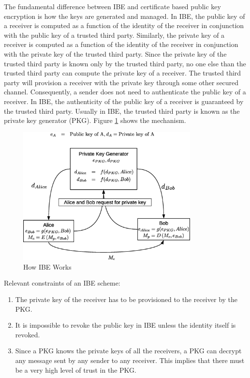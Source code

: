 \documentclass{river-journal}
\begin{document}
The fundamental difference between IBE and certificate based public key encryption is how the keys are generated and managed. In IBE, the public key of a receiver is computed as a function of the identity of the receiver in conjunction with the public key of a trusted third party. Similarly, the private key of a receiver is computed as a function of the identity of the receiver in conjunction with the private key of the trusted third party. Since the private key of the trusted third party is known only by the trusted third party, no one else than the trusted third party can compute the private key of a receiver. The trusted third party will provision a receiver with the private key through some other secured channel. Consequently, a sender does not need to authenticate the public key of a receiver. In IBE, the authenticity of the public key of a receiver is guaranteed by the trusted third party. Usually in IBE, the trusted third party is known as the private key generator (PKG). Figure \ref{fig:how_IBE_works} shows the mechanism.


\begin{figure}
\begin{center}
  \includegraphics[height=7cm]{how_IBE_works.eps}
\caption{How IBE Works}
\label{fig:how_IBE_works}       %
\end{center}
\end{figure}

Relevant constraints of an IBE scheme:
\begin{enumerate}
 \item The private key of the receiver has to be provisioned to the receiver by the PKG.
 \item It is impossible to revoke the public key in IBE unless the identity itself is revoked.
 \item Since a PKG knows the private keys of all the receivers, a PKG can decrypt any message sent by any sender to any receiver. This implies that there must be a very high level of trust in the PKG.
\end{enumerate}
\end{document}
